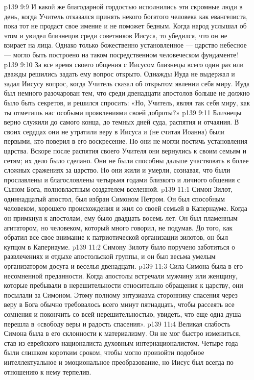 \vs p139 9:9 И какой же благодарной гордостью исполнились эти скромные люди в день, когда Учитель отказался принять некого богатого человека как евангелиста, пока тот не продаст свое имение и не поможет бедным. Когда народ услышал об этом и увидел близнецов среди советников Иисуса, то убедился, что он не взирает на лица. Однако только божественно установленное --- царство небесное --- могло быть построено на таком посредственном человеческом фундаменте!
\vs p139 9:10 За все время своего общения с Иисусом близнецы всего один раз или дважды решились задать ему вопрос открыто. Однажды Иуда не выдержал и задал Иисусу вопрос, когда Учитель сказал об открытом явлении себя миру. Иуда был немного разочарован тем, что среди двенадцати апостолов больше не должно было быть секретов, и решился спросить: «Но, Учитель, являя так себя миру, как ты отметишь нас особыми проявлениями своей доброты?»
\vs p139 9:11 \pc Близнецы верно служили до самого конца, до темных дней суда, распятия и отчаяния. В своих сердцах они не утратили веру в Иисуса и (не считая Иоанна) были первыми, кто поверил в его воскресение. Но они не могли постичь установления царства. Вскоре после распятия своего Учителя они вернулись к своим семьям и сетям; их дело было сделано. Они не были способны дальше участвовать в более сложных сражениях за царство. Но они жили и умерли, сознавая, что были прославлены и благословлены четырьмя годами близкого и личного общения с Сыном Бога, полновластным создателем вселенной.
\vs p139 11:1 Симон Зилот, одиннадцатый апостол, был избран Симоном Петром. Он был способным человеком, хорошего происхождения и жил со своей семьей в Капернауме. Когда он примкнул к апостолам, ему было двадцать восемь лет. Он был пламенным агитатором, но человеком, который много говорил, не подумав. До того, как обратил все свое внимание к патриотической организации зилотов, он был купцом в Капернауме.
\vs p139 11:2 \pc Симону Зилоту было поручено заботиться о развлечениях и отдыхе апостольской группы, и он был весьма умелым организатором досуга и веселья двенадцати.
\vs p139 11:3 Сила Симона была в его несомненной преданности. Когда апостолы встречали мужчину или женщину, которые пребывали в нерешительности относительно обращения к царству, они посылали за Симоном. Этому полному энтузиазма стороннику спасения через веру в Бога обычно требовалось всего минут пятнадцать, чтобы рассеять все сомнения и покончить со всей нерешительностью, увидеть, что еще одна душа перешла в «свободу веры и радость спасения».
\vs p139 11:4 Великая слабость Симона была в его склонности к материализму. Он не мог быстро измениться, став из еврейского националиста духовным интернационалистом. Четыре года были слишком коротким сроком, чтобы могло произойти подобное интеллектуальное и эмоциональное преобразование, но Иисус был всегда по отношению к нему терпелив.

